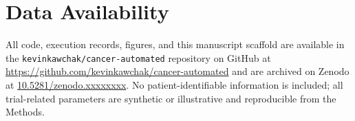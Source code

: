 {}
\section*{Data Availability}
\label{sec:data}

All code, execution records, figures, and this manuscript scaffold are available
in the \texttt{kevinkawchak/cancer-automated} repository on GitHub at
\url{https://github.com/kevinkawchak/cancer-automated} and are archived on
Zenodo at \href{https://doi.org/10.5281/zenodo.xxxxxxxx}{10.5281/zenodo.xxxxxxxx}.
No patient-identifiable information is included; all trial-related parameters are
synthetic or illustrative and reproducible from the Methods.
